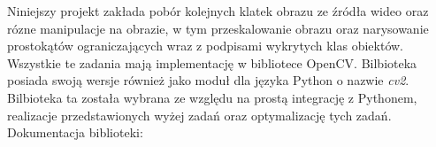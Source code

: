 Niniejszy projekt zakłada pobór kolejnych klatek obrazu ze źródła wideo oraz rózne manipulacje na obrazie, w tym przeskalowanie obrazu oraz narysowanie prostokątów ograniczających wraz z podpisami wykrytych klas obiektów. Wszystkie te zadania mają implementację w bibliotece OpenCV. Bilbioteka posiada swoją wersje również jako moduł dla języka Python o nazwie \emph{cv2}. Bilbioteka ta została wybrana ze względu na prostą integrację z Pythonem, realizacje przedstawionych wyżej zadań oraz optymalizację tych zadań. Dokumentacja biblioteki: \cite{OpenCV_docs}

